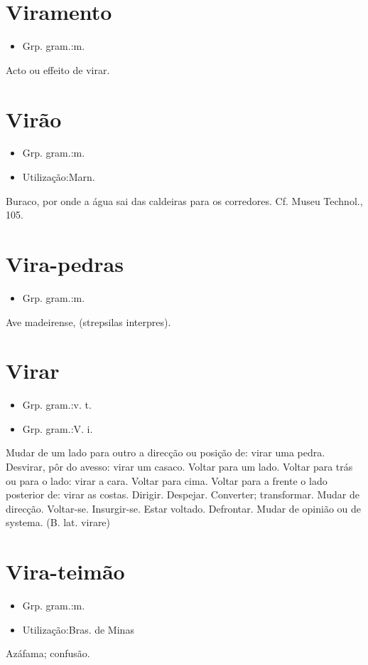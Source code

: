 \documentclass{article}
\begin{document}
\section{Viramento}
\begin{itemize}
\item {Grp. gram.:m.}
\end{itemize}
Acto ou effeito de virar.
\section{Virão}
\begin{itemize}
\item {Grp. gram.:m.}
\end{itemize}
\begin{itemize}
\item {Utilização:Marn.}
\end{itemize}
Buraco, por onde a água sai das caldeiras para os corredores. Cf. \textunderscore Museu Technol.\textunderscore , 105.
\section{Vira-pedras}
\begin{itemize}
\item {Grp. gram.:m.}
\end{itemize}
Ave madeirense, (\textunderscore strepsilas interpres\textunderscore ).
\section{Virar}
\begin{itemize}
\item {Grp. gram.:v. t.}
\end{itemize}
\begin{itemize}
\item {Grp. gram.:V. i.}
\end{itemize}
Mudar de um lado para outro a direcção ou posição de: \textunderscore virar uma pedra\textunderscore .
Desvirar, pôr do avesso: \textunderscore virar um casaco\textunderscore .
Voltar para um lado.
Voltar para trás ou para o lado: \textunderscore virar a cara\textunderscore .
Voltar para cima.
Voltar para a frente o lado posterior de: \textunderscore virar as costas\textunderscore .
Dirigir.
Despejar.
Converter; transformar.
Mudar de direcção.
Voltar-se.
Insurgir-se.
Estar voltado.
Defrontar.
Mudar de opinião ou de systema.
(B. lat. \textunderscore virare\textunderscore )
\section{Vira-teimão}
\begin{itemize}
\item {Grp. gram.:m.}
\end{itemize}
\begin{itemize}
\item {Utilização:Bras. de Minas}
\end{itemize}
Azáfama; confusão.
\end{document}
